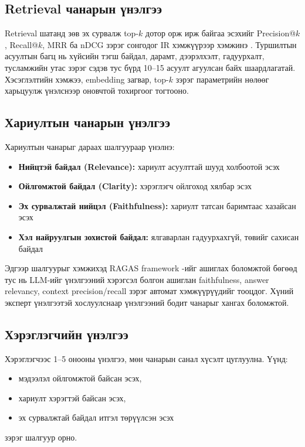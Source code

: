 \subsection{Retrieval чанарын үнэлгээ}

Retrieval шатанд зөв эх сурвалж top-$k$ дотор орж ирж байгаа эсэхийг Precision@$k$, Recall@$k$, MRR ба nDCG зэрэг сонгодог IR хэмжүүрээр хэмжинэ \cite{dpr}. Туршилтын асуултын багц нь хүйсийн тэгш байдал, дарамт, дээрэлхэлт, гадуурхалт, тусламжийн утас зэрэг сэдэв тус бүрд 10--15 асуулт агуулсан байх шаардлагатай. Хэсэглэлтийн хэмжээ, embedding загвар, top-$k$ зэрэг параметрийн нөлөөг харьцуулж үнэлснээр оновчтой тохиргоог тогтооно.

\subsection{Хариултын чанарын үнэлгээ}

Хариултын чанарыг дараах шалгуураар үнэлнэ:
\begin{itemize}
    \item \textbf{Нийцтэй байдал (Relevance):} хариулт асуулттай шууд холбоотой эсэх \cite{ragas}
    \item \textbf{Ойлгомжтой байдал (Clarity):} хэрэглэгч ойлгоход хялбар эсэх
    \item \textbf{Эх сурвалжтай нийцэл (Faithfulness):} хариулт татсан баримтаас хазайсан эсэх \cite{ragas, hallucination_survey}
    \item \textbf{Хэл найруулгын зохистой байдал:} ялгаварлан гадуурхахгүй, төвийг сахисан байдал
\end{itemize}

Эдгээр шалгуурыг хэмжихэд RAGAS framework \cite{ragas}-ийг ашиглах боломжтой бөгөөд тус нь LLM-ийг үнэлгээний хэрэгсэл болгон ашиглан faithfulness, answer relevancy, context precision/recall зэрэг автомат хэмжүүрүүдийг тооцдог. Хүний эксперт үнэлгээтэй хослуулснаар үнэлгээний бодит чанарыг хангах боломжтой.

\subsection{Хэрэглэгчийн үнэлгээ}

Хэрэглэгчээс 1--5 онооны үнэлгээ, мөн чанарын санал хүсэлт цуглуулна. Үүнд:
\begin{itemize}
    \item мэдээлэл ойлгомжтой байсан эсэх,
    \item хариулт хэрэгтэй байсан эсэх,
    \item эх сурвалжтай байдал итгэл төрүүлсэн эсэх
\end{itemize}
зэрэг шалгуур орно.

